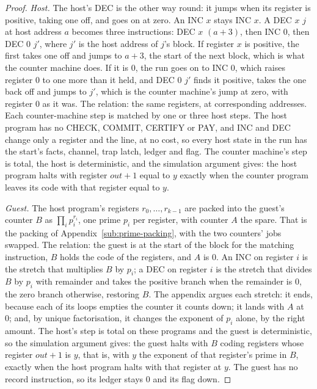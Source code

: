 \documentclass[11pt,twoside]{article}
\theoremstyle{thielethm}
\theoremstyle{thieledef}
\theoremstyle{thieledef}
\theoremstyle{thieledef}
\theoremstyle{thielethm}
\theoremstyle{thieleobs}
\theoremstyle{thielethm}
\begin{document}
\begin{proof}
\emph{Host.} The host's DEC is the other way round: it jumps when its register is positive, taking
one off, and goes on at zero. An INC $x$ stays INC $x$. A DEC $x$ $j$ at host address $a$ becomes
three instructions: DEC $x$ $(a + 3)$, then INC 0, then DEC 0 $j'$, where $j'$ is the host address
of $j$'s block. If register $x$ is positive, the first takes one off and jumps to $a + 3$, the
start of the next block, which is what the counter machine does. If it is 0, the run goes on to
INC 0, which raises register 0 to one more than it held, and DEC 0 $j'$ finds it positive, takes
the one back off and jumps to $j'$, which is the counter machine's jump at zero, with register 0
as it was. The relation: the same registers, at corresponding addresses. Each counter-machine step
is matched by one or three host steps. The host program has no CHECK, COMMIT, CERTIFY or PAY, and
INC and DEC change only a register and the line, at no cost, so every host state in the run has
the start's facts, channel, trap latch, ledger and flag. The counter machine's step is total, the
host is deterministic, and the simulation argument gives: the host program halts with register
$\mathit{out} + 1$ equal to $y$ exactly when the counter program leaves its code with that
register equal to $y$.

\emph{Guest.} The host program's registers $r_0, \ldots, r_{k-1}$ are packed into the guest's
counter $B$ as $\prod_i p_i^{r_i}$, one prime $p_i$ per register, with counter $A$ the spare. That
is the packing of Appendix~\ref{sub:prime-packing}, with the two counters' jobs swapped. The
relation: the guest is at the start of the block for the matching instruction, $B$ holds the code
of the registers, and $A$ is 0. An INC on register $i$ is the stretch that multiplies $B$ by
$p_i$; a DEC on register $i$ is the stretch that divides $B$ by $p_i$ with remainder and takes the
positive branch when the remainder is 0, the zero branch otherwise, restoring $B$. The appendix
argues each stretch: it ends, because each of its loops empties the counter it counts down; it
lands with $A$ at 0; and, by unique factorisation, it changes the exponent of $p_i$ alone, by the
right amount. The host's step is total on these programs and the guest is deterministic, so the
simulation argument gives: the guest halts with $B$ coding registers whose register
$\mathit{out} + 1$ is $y$, that is, with $y$ the exponent of that register's prime in $B$, exactly
when the host program halts with that register at $y$. The guest has no record instruction, so its
ledger stays 0 and its flag down.


\end{proof}
\end{document}
